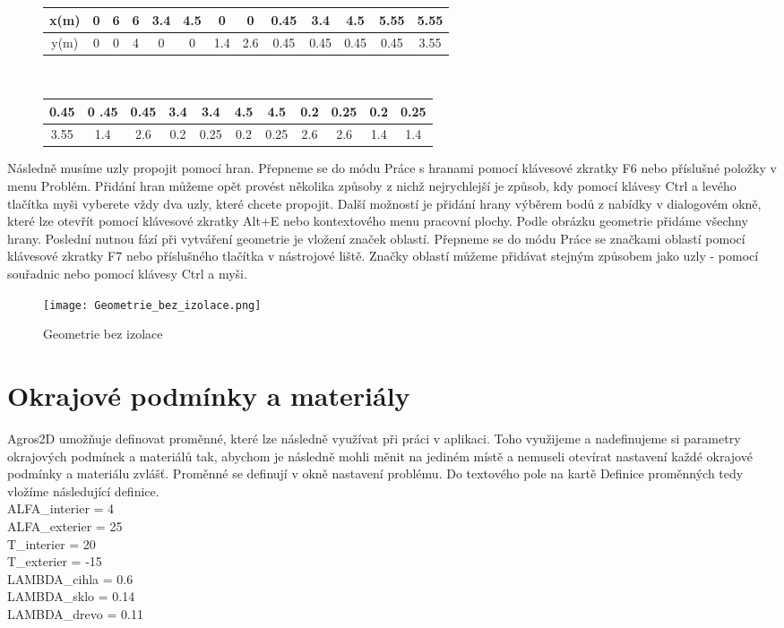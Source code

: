 \documentclass[a4paper, oneside]{article}
\begin{document}
\begin{figure}[htbp]
\centering
	
\begin{tabular}{|c|c|c|c|c|c|c|c|c|c|c|c|c|}
\hline
x(m) & 0 & 6 & 6 & 3.4 & 4.5 & 0 & 0 & 0.45 & 3.4 & 4.5 & 5.55 & 5.55\\
\hline
y(m) & 0 & 0 & 4 & 0 & 0 & 1.4 & 2.6 & 0.45 & 0.45 & 0.45 & 0.45 & 3.55\\
\hline 
\end{tabular} \\
\begin{tabular}{|c|c|c|c|c|c|c|c|c|c|c|}
\hline
 0.45 &0 .45 & 0.45 & 3.4 & 3.4 & 4.5 & 4.5 & 0.2 & 0.25 & 0.2 & 0.25\\
\hline
 3.55 & 1.4 & 2.6 & 0.2 & 0.25 & 0.2 & 0.25 & 2.6 & 2.6 & 1.4 & 1.4\\
\hline 
\end{tabular}
\end{figure}
	Následně musíme uzly propojit pomocí hran. Přepneme se do módu Práce s hranami pomocí klávesové zkratky F6 nebo příslušné položky v menu Problém. Přidání hran můžeme opět provést několika způsoby z nichž nejrychlejší je způsob, kdy pomocí klávesy Ctrl a levého tlačítka myši vyberete vždy dva uzly, které chcete propojit. Další možností je přidání hrany výběrem bodů z nabídky v dialogovém okně, které lze otevřít pomocí klávesové zkratky Alt+E nebo kontextového menu pracovní plochy. Podle obrázku geometrie přidáme všechny hrany. Poslední nutnou fází při vytváření geometrie je vložení značek oblastí. Přepneme se do módu Práce se značkami oblastí pomocí klávesové zkratky F7 nebo příslušného tlačítka v nástrojové liště. Značky oblastí můžeme přidávat stejným způsobem jako uzly - pomocí souřadnic nebo pomocí klávesy Ctrl a myši.\\
	
\begin{figure}[htbp]
\centering
\texttt{[image: Geometrie\_bez\_izolace.png]}\\
\caption{Geometrie bez izolace}
\end{figure}

\section{Okrajové podmínky a materiály}
	
	Agros2D umožňuje definovat proměnné, které lze následně využívat při práci v aplikaci. Toho využijeme a nadefinujeme si parametry okrajových podmínek a materiálů tak, abychom je následně mohli měnit na jediném místě a nemuseli otevírat nastavení každé okrajové podmínky a materiálu zvlášť. Proměnné se definují v okně nastavení problému. Do textového pole na kartě Definice proměnných tedy vložíme následující definice.\\
ALFA\_interier = 4\\
ALFA\_exterier = 25\\
T\_interier = 20\\
T\_exterier = -15\\
LAMBDA\_cihla = 0.6\\
LAMBDA\_sklo = 0.14\\
LAMBDA\_drevo = 0.11\\
\end{document}
